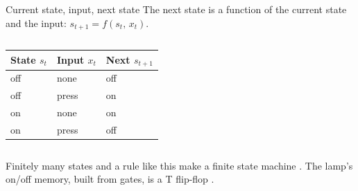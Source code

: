 \documentclass[10pt]{wosm-slides}
\begin{document}
\begin{frame}{Current state, input, next state}
  The next state is a function of the current state and the input:
  $s_{t+1} = f(s_t,\, x_t)$.

  \smallskip
  \begin{columns}[T, totalwidth=\textwidth]
      \par\smallskip
      \small
      \begin{tabular}{@{}lll@{}}
        \toprule
        State $s_t$ & Input $x_t$ & Next $s_{t+1}$ \\
        \midrule
        off & none & off \\
        off & press & on \\
        on & none & on \\
        on & press & off \\
        \bottomrule
      \end{tabular}
      \centering
  \end{columns}

  \begin{remark}
    Finitely many states and a rule like this make a finite state machine
    . The lamp's on/off memory, built from gates, is a T flip-flop
    .
  \end{remark}
\end{frame}
\end{document}

